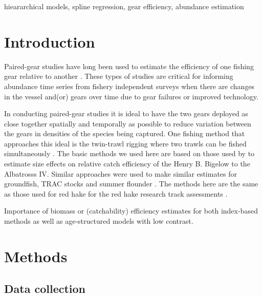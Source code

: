 \documentclass[]{article}
\begin{document}
hieararchical models, spline regression, gear efficiency, abundance
estimation

\pagebreak

\hypertarget{introduction}{%
\section{Introduction}\label{introduction}}

Paired-gear studies have long been used to estimate the efficiency of
one fishing gear relative to another
\citep[e.g.,][]{gulland64,bourne65}. These types of studies are critical
for informing abundance time series from fishery independent surveys
when there are changes in the vessel and(or) gears over time due to gear
failures or improved technology.

In conducting paired-gear studies it is ideal to have the two gears
deployed as close together spatially and temporally as possible to
reduce variation between the gears in densities of the species being
captured. One fishing method that approaches this ideal is the
twin-trawl rigging where two trawls can be fished simultaneously
\citep{ices96}. The basic methods we used here are based on those used
by \citet{miller13} to estimate size effects on relative catch
efficiency of the Henry B. Bigelow to the Albatrosss IV. Similar
approaches were used to make similar estimates for groundfish, TRAC
stocks and summer flounder \citep{milleretal17a, milleretal17b}. The
methods here are the same as those used for red hake for the red hake
research track assessments \citep{milleretal20}.

Importance of biomass or (catchability) efficiency estimates for both
index-based methods as well as age-structured models with low contrast.

\hypertarget{methods}{%
\section{Methods}\label{methods}}

\hypertarget{data-collection}{%
\subsection{Data collection}\label{data-collection}}
\end{document}

